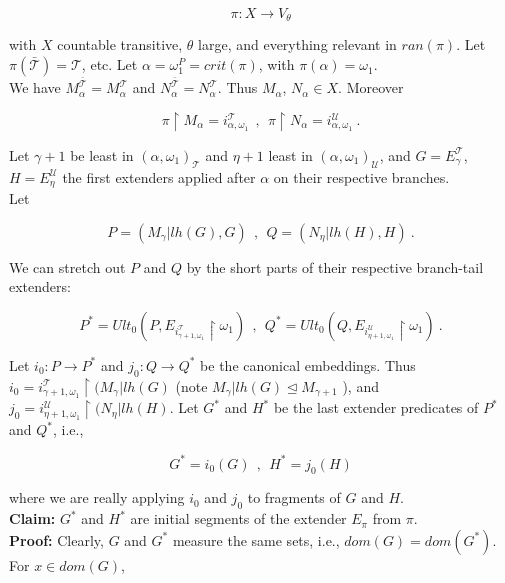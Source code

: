 \documentclass[12pt]{article}
\begin{document}
\[
\pi: X \longrightarrow V_\theta
\]

with $X$ countable transitive, $\theta$ large, and everything relevant in $ran(\pi)$.  Let $\pi(\bar{\mathscr{T}}) = \mathscr{T}$, etc.  Let $\alpha = \omega_1^P = crit(\pi)$, with $\pi(\alpha) = \omega_1$.\\

We have $M_\alpha^{\bar{\mathscr{T}}} = M_\alpha^{\mathscr{T}}$ and $N_\alpha^{\bar{\mathscr{T}}} = N_\alpha^{\mathscr{T}}$.  Thus $M_\alpha$, $N_\alpha \in X$.  Moreover

\[
\pi \restriction M_\alpha = i_{\alpha , \omega_1}^{\mathscr{T}}\ \ , \ \ \pi \restriction N_\alpha = i_{\alpha , \omega_1}^{\mathscr{U}} \ .
\]

Let $\gamma + 1$ be least in $(\alpha, \omega_1)_{\mathscr{T}}$ and $\eta + 1$ least in $(\alpha, \omega_1)_{\mathscr{U}}$, and $G = E_\gamma^{\mathscr{T}}$, $H = E_\eta^{\mathscr{U}}$ the first extenders applied after $\alpha$ on their respective branches.\\

Let

\[
P = (M_\gamma | lh(G), G) \ \ , \ \ Q = (N_\eta | lh(H), H) \ .
\]

We can stretch out $P$ and $Q$ by the short parts of their respective branch-tail extenders:

\[
P^* = Ult_0 (P, E_{i^{\mathscr{T}}_{\gamma + 1, \omega_1}} \restriction \omega_1)\ \ , \ \ Q^* = Ult_0 (Q, E_{i^{\mathscr{U}}_{\eta + 1, \omega_1}} \restriction \omega_1) \ .
\]

Let $i_0 : P \longrightarrow P^*$ and $j_0 : Q \longrightarrow Q^*$ be the canonical embeddings.  Thus $i_0 = i^{\mathscr{T}}_{\gamma + 1 , \omega_1} \restriction (M_\gamma | lh(G)$ (note $M_\gamma | lh (G) \unlhd M_{\gamma + 1}$ ), and $j_0 = i^{\mathscr{U}}_{\eta + 1 , \omega_1} \restriction (N_\eta | lh(H)$.  Let $G^*$ and $H^*$ be the last extender predicates of $P^*$ and $Q^*$, i.e.,

\[
G^* = i_0 (G)\ \ , \ \ H^* = j_0 (H)
\]

where we are really applying $i_0$ and $j_0$ to fragments of $G$ and $H$.\\

\textbf{Claim:} $G^*$ and $H^*$ are initial segments of the extender $E_\pi$ from $\pi$.\\

\indent \indent \textbf{Proof:} Clearly, $G$ and $G^*$ measure the same sets, i.e., $dom (G) = dom(G^*)$.  For $x \in dom(G)$,
\end{document}
